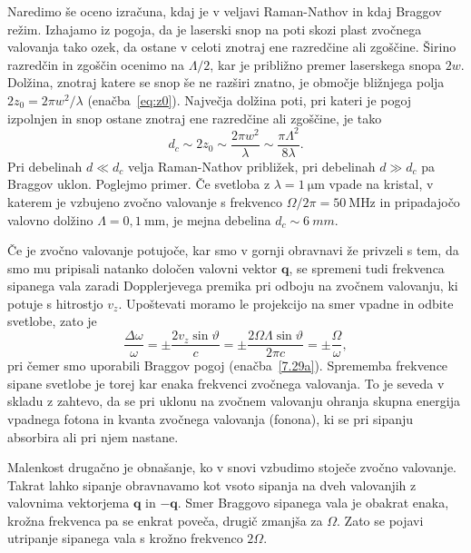 \begin{remark}
Naredimo še oceno izračuna, kdaj je v veljavi Raman-Nathov in kdaj Braggov režim. 
Izhajamo iz pogoja, da je laserski snop na poti skozi plast zvočnega 
valovanja tako ozek, da ostane v celoti znotraj
ene razredčine ali zgoščine. Širino razredčin in zgoščin ocenimo na $\Lambda/2$, kar je  
približno premer laserskega snopa $2w$. Dolžina, znotraj katere se snop še ne razširi znatno,
je območje bližnjega polja $2z_0 = 2 \pi w^2/\lambda$ (enačba~\ref{eq:z0}). Največja dolžina poti, pri 
kateri je pogoj izpolnjen in snop ostane znotraj ene razredčine ali zgoščine, je tako
\begin{equation}
d_c \sim 2z_0 \sim \frac{2 \pi w^2}{\lambda} \sim \frac{\pi \Lambda^2}{8 \lambda}.
\end{equation}
Pri debelinah $d \ll d_c$ velja Raman-Nathov približek, pri debelinah $d \gg d_c$ pa Braggov uklon.
Poglejmo primer. Če svetloba z $\lambda = 1~\si{\micro\metre}$ vpade na kristal, 
v katerem je vzbujeno zvočno valovanje s frekvenco $\Omega/2\pi = 50~\si{\mega\hertz}$ in
pripadajočo valovno dolžino $\Lambda = 0,1~\si{\milli\metre}$, je mejna debelina $d_c \sim 6~\si{mm}$.
\end{remark}

Če je zvočno valovanje potujoče, kar smo v gornji obravnavi že privzeli
s tem, da smo mu pripisali natanko določen valovni vektor $\mathbf{q}$,
se spremeni tudi frekvenca sipanega vala zaradi Dopplerjevega premika
pri odboju na zvočnem valovanju, ki potuje s hitrostjo $v_{z}$. Upoštevati
moramo le projekcijo na smer vpadne in odbite svetlobe, zato je 
\begin{equation}
\frac{\Delta\omega}{\omega}=\pm\frac{2v_{z}\sin\vartheta}{c}=
\pm\frac{2\Omega\Lambda\sin\vartheta}{2 \pi c}=\pm\frac{\Omega}{\omega},
\label{7.32}
\end{equation}
pri čemer smo uporabili Braggov pogoj (enačba~\ref{7.29a}). Sprememba frekvence
sipane svetlobe je torej kar enaka frekvenci zvočnega valovanja. To je seveda v skladu 
z zahtevo, da se pri uklonu na zvočnem valovanju ohranja skupna energija
vpadnega fotona in kvanta zvočnega valovanja (fonona), ki se pri sipanju 
absorbira ali pri njem nastane.

Malenkost drugačno je obnašanje, ko v snovi vzbudimo stoječe zvočno valovanje. 
Takrat lahko sipanje obravnavamo kot vsoto sipanja na dveh valovanjih z valovnima 
vektorjema $\mathbf{q}$ in $-\mathbf{q}$. Smer Braggovo sipanega vala je obakrat enaka, 
krožna frekvenca pa se enkrat poveča, drugič zmanjša za $\Omega$. Zato se pojavi utripanje
sipanega vala s krožno frekvenco $2\Omega$.

